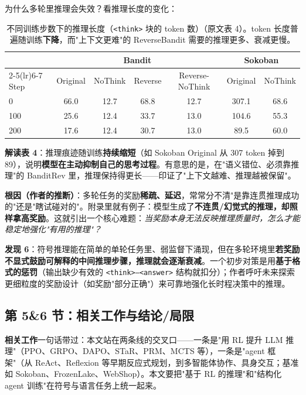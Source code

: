 \documentclass[11pt,UTF8,fontset=fandol]{ctexart}
\begin{document}
为什么多轮里推理会失效？看推理长度的变化：

\begin{table}[H]\centering
\caption{不同训练步数下的推理长度（\texttt{<think>} 块的 token 数）（原文表 4）。token 长度普遍随训练\textbf{下降}，而"上下文更难"的 ReverseBandit 需要的推理更多、衰减更慢。}
\begin{tabular}{lcccccc}
\toprule
 & \multicolumn{4}{c}{Bandit} & \multicolumn{2}{c}{Sokoban} \\
\cmidrule(lr){2-5}\cmidrule(lr){6-7}
Step & Original & NoThink & Reverse & Reverse-NoThink & Original & NoThink \\ \midrule
0   & 66.0 & 12.7 & 68.8 & 12.7 & 307.1 & 68.6 \\
100 & 25.6 & 12.4 & 33.7 & 13.0 & 104.6 & 55.3 \\
200 & 17.6 & 12.4 & 30.7 & 13.0 & 89.5  & 60.0 \\
\bottomrule
\end{tabular}
\end{table}

\textbf{解读表 4}：推理痕迹随训练\textbf{持续缩短}（如 Sokoban Original 从 307 token 掉到 89），说明\textbf{模型在主动抑制自己的思考过程}。有意思的是，在"语义错位、必须靠推理"的 BanditRev 里，推理保持得更长——印证了"上下文越难、推理越被保留"。

\textbf{根因（作者的推断）}：多轮任务的奖励\textbf{稀疏、延迟}，常常分不清"是靠连贯推理成功的"还是"瞎试碰对的"。附录里就有例子：模型生成了\textbf{不连贯/幻觉式的推理，却照样拿高奖励}。这就引出一个核心难题：\emph{当奖励本身无法反映推理质量时，怎么才能稳定地强化"有用的推理"？}

\begin{findbox}
\textbf{发现 6}：符号推理能在简单的单轮任务里、弱监督下涌现，但在多轮环境里\textbf{若奖励不显式鼓励可解释的中间推理步骤，推理就会逐渐衰减}。一个初步对策是用\textbf{基于格式的惩罚}（输出缺少有效的 \texttt{<think>--<answer>} 结构就扣分）；作者呼吁未来探索更细粒度的奖励设计（如奖励"部分正确"）来可靠地强化长时程决策中的推理。
\end{findbox}

\subsection{第 5\&6 节：相关工作与结论/局限}

\textbf{相关工作}一句话带过：本文站在两条线的交叉口——一条是"用 RL 提升 LLM 推理"（PPO、GRPO、DAPO、STaR、PRM、MCTS 等），一条是"agent 框架"（从 ReAct、Reflexion 等早期反应式规划，到多智能体协作、具身交互；基准如 Sokoban、FrozenLake、WebShop）。本文要把"基于 RL 的推理"和"结构化 agent 训练"在符号与语言任务上统一起来。
\end{document}

